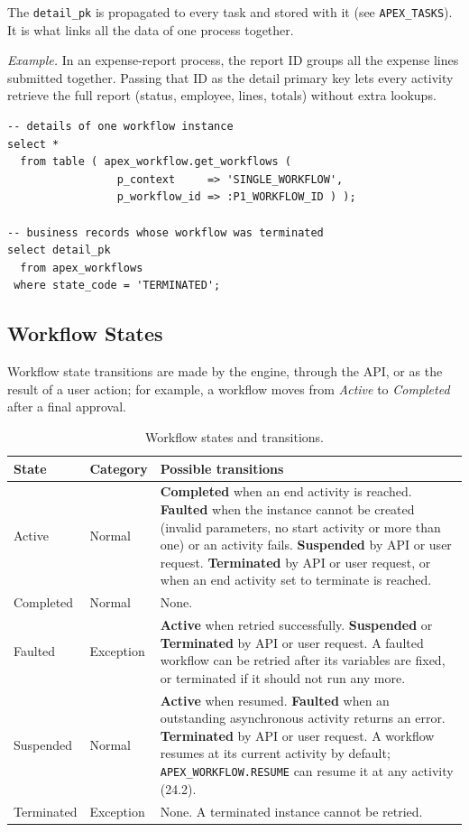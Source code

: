 \documentclass[11pt,a4paper]{article}
\begin{document}
The \texttt{detail\_pk} is propagated to every task and stored with it (see \texttt{APEX\_TASKS}). It is what links all the data of one process together.

\textit{Example.} In an expense-report process, the report ID groups all the expense lines submitted together. Passing that ID as the detail primary key lets every activity retrieve the full report (status, employee, lines, totals) without extra lookups.

\begin{lstlisting}
-- details of one workflow instance
select *
  from table ( apex_workflow.get_workflows (
                 p_context     => 'SINGLE_WORKFLOW',
                 p_workflow_id => :P1_WORKFLOW_ID ) );

-- business records whose workflow was terminated
select detail_pk
  from apex_workflows
 where state_code = 'TERMINATED';
\end{lstlisting}

\subsection{Workflow States}
Workflow state transitions are made by the engine, through the API, or as the result of a user action; for example, a workflow moves from \emph{Active} to \emph{Completed} after a final approval.

\begin{table}[H]
\centering\small
\begin{tabularx}{\textwidth}{@{}llL@{}}
\toprule
\sffamily\bfseries State & \sffamily\bfseries Category & \sffamily\bfseries Possible transitions \\
\midrule
Active & Normal & \textbf{Completed} when an end activity is reached. \textbf{Faulted} when the instance cannot be created (invalid parameters, no start activity or more than one) or an activity fails. \textbf{Suspended} by API or user request. \textbf{Terminated} by API or user request, or when an end activity set to terminate is reached. \\
Completed & Normal & None. \\
Faulted & Exception & \textbf{Active} when retried successfully. \textbf{Suspended} or \textbf{Terminated} by API or user request. A faulted workflow can be retried after its variables are fixed, or terminated if it should not run any more. \\
Suspended & Normal & \textbf{Active} when resumed. \textbf{Faulted} when an outstanding asynchronous activity returns an error. \textbf{Terminated} by API or user request. A workflow resumes at its current activity by default; \texttt{APEX\_WORKFLOW.RESUME} can resume it at any activity (24.2). \\
Terminated & Exception & None. A terminated instance cannot be retried. \\
\bottomrule
\end{tabularx}
\caption{Workflow states and transitions.}
\end{table}
\end{document}
